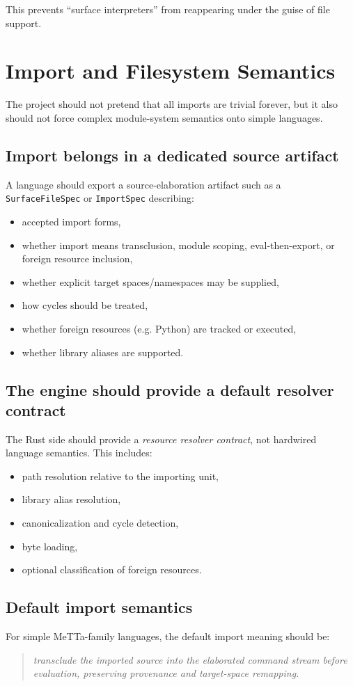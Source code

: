 \documentclass[11pt]{article}
\begin{document}
This prevents ``surface interpreters'' from reappearing under the guise of file support.

\section{Import and Filesystem Semantics}

The project should not pretend that all imports are trivial forever, but it also should not force complex module-system semantics onto simple languages.

\subsection{Import belongs in a dedicated source artifact}
A language should export a source-elaboration artifact such as a \texttt{SurfaceFileSpec} or \texttt{ImportSpec} describing:
\begin{itemize}
  \item accepted import forms,
  \item whether import means transclusion, module scoping, eval-then-export, or foreign resource inclusion,
  \item whether explicit target spaces/namespaces may be supplied,
  \item how cycles should be treated,
  \item whether foreign resources (e.g. Python) are tracked or executed,
  \item whether library aliases are supported.
\end{itemize}

\subsection{The engine should provide a default resolver contract}
The Rust side should provide a \emph{resource resolver contract}, not hardwired language semantics. This includes:
\begin{itemize}
  \item path resolution relative to the importing unit,
  \item library alias resolution,
  \item canonicalization and cycle detection,
  \item byte loading,
  \item optional classification of foreign resources.
\end{itemize}

\subsection{Default import semantics}
For simple MeTTa-family languages, the default import meaning should be:
\begin{quote}
\emph{transclude the imported source into the elaborated command stream before evaluation, preserving provenance and target-space remapping.}
\end{quote}
\end{document}
